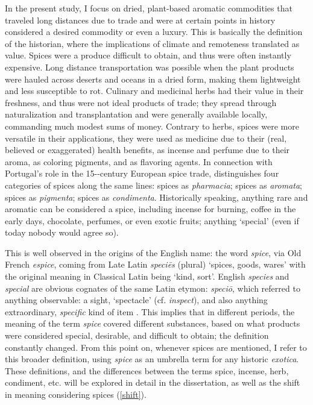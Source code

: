 In the present study, I focus on dried, plant-based aromatic commodities that traveled long distances due to trade and were at certain points in history considered a desired commodity or even a luxury. This is basically the definition of the historian, where the implications of climate and remoteness translated as value. Spices were a produce difficult to obtain, and thus were often instantly expensive. Long distance transportation was possible when the plant products were hauled across deserts and oceans in a dried form, making them lightweight and less susceptible to rot. Culinary and medicinal herbs had their value in their freshness, and thus were not ideal products of trade; they spread through naturalization and transplantation and were generally available locally, commanding much modest sums of money. Contrary to herbs, spices were more versatile in their applications, they were used as medicine due to their (real, believed or exaggerated) health benefits, as incense and perfume due to their aroma, as coloring pigments, and as flavoring agents. In connection with Portugal's role in the 15--century European spice trade, \textcite{halikowski_smith_portugal_2001} distinguishes four categories of spices along the same lines: spices as \textit{pharmacia}; spices as \textit{aromata}; spices as \textit{pigmenta}; spices as \textit{condimenta}. Historically speaking, anything rare and aromatic can be considered a spice, including incense for burning, coffee in the early days, chocolate, perfumes, or even exotic fruits; anything `special' (even if today nobody would agree so).

This is well observed in the origins of the English name: the word \textit{spice}, via Old French \textit{espice}, coming from Late Latin \textit{speciēs} (plural) `spices, goods, wares' with the original meaning in Classical Latin being `kind, sort'. English \textit{species} and \textit{special} are obvious cognates of the same Latin etymon: \textit{speciō}, which referred to anything observable: a sight, `spectacle' (cf. \textit{inspect}), and also anything extraordinary, \textit{specific} kind of item \autocite[1983-84]{glare_oxford_2012}. This implies that in different periods, the meaning of the term \textit{spice} covered different substances, based on what products were considered special, desirable, and difficult to obtain; the definition constantly changed. From this point on, whenever spices are mentioned, I refer to this broader definition, using \textit{spice} as an umbrella term for any historic \textit{exotica}. These definitions, and the differences between the terms spice, incense, herb, condiment, etc. will be explored in detail in the dissertation, as well as the shift in meaning considering spices (\cref{shift}).

